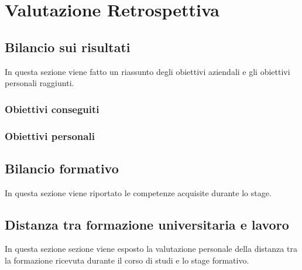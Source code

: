 
\chapter{Valutazione Retrospettiva}
\label{cap:valutazione-retrospettiva}




\section{Bilancio sui risultati}
In questa sezione viene fatto un riassunto degli obiettivi aziendali e gli obiettivi personali raggiunti.
\subsection{Obiettivi conseguiti}
\subsection{Obiettivi personali}




\section{Bilancio formativo}
In questa sezione viene riportato le competenze acquisite durante lo stage.




\section{Distanza tra formazione universitaria e lavoro}
In questa sezione sezione viene esposto la valutazione personale della distanza tra la formazione ricevuta durante il corso di studi e lo stage formativo.
